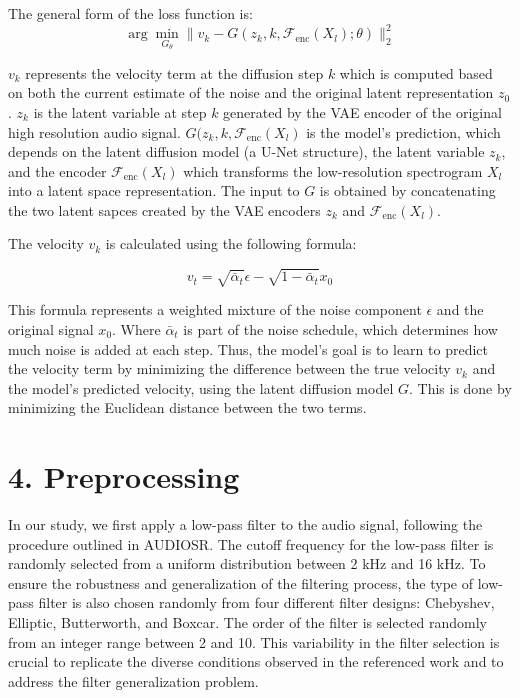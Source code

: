 \documentclass[
  ]{scrartcl}
\begin{document}
The general form of the loss function is:
\[\arg\min_{G_\theta} \|v_k - G(z_k, k, \mathcal{F}_{\text{enc}}(X_l); \theta)\|_2^2\]

\(v_k\) represents the velocity term at the diffusion step \(𝑘\) which
is computed based on both the current estimate of the noise and the
original latent representation \(z_0\). \(z_k\) is the latent variable
at step \(𝑘\) generated by the VAE encoder of the original high
resolution audio signal. \(G(z_k, k, \mathcal{F}_{\text{enc}}(X_l)\) is
the model's prediction, which depends on the latent diffusion model (a
U-Net structure), the latent variable \(z_k\), and the encoder
\(\mathcal{F}_{\text{enc}}(X_l)\) which transforms the low-resolution
spectrogram \(X_l\) into a latent space representation. The input to
\(G\) is obtained by concatenating the two latent sapces created by the
VAE encoders \(z_k\) and \(\mathcal{F}_{\text{enc}}(X_l)\).

The velocity \(v_k\) is calculated using the following formula:

\[v_t = \sqrt{\bar{\alpha}_t} \epsilon - \sqrt{1 - \bar{\alpha}_t} x_0\]

This formula represents a weighted mixture of the noise component
\(\epsilon\) and the original signal \(x_0\). Where \({\bar{\alpha}_t}\)
is part of the noise schedule, which determines how much noise is added
at each step. Thus, the model's goal is to learn to predict the velocity
term by minimizing the difference between the true velocity \(v_k\) and
the model's predicted velocity, using the latent diffusion model \(G\).
This is done by minimizing the Euclidean distance between the two terms.

\section{4. Preprocessing}\label{preprocessing}

In our study, we first apply a low-pass filter to the audio signal,
following the procedure outlined in AUDIOSR. The cutoff frequency for
the low-pass filter is randomly selected from a uniform distribution
between 2 kHz and 16 kHz. To ensure the robustness and generalization of
the filtering process, the type of low-pass filter is also chosen
randomly from four different filter designs: Chebyshev, Elliptic,
Butterworth, and Boxcar. The order of the filter is selected randomly
from an integer range between 2 and 10. This variability in the filter
selection is crucial to replicate the diverse conditions observed in the
referenced work and to address the filter generalization problem.
\end{document}
